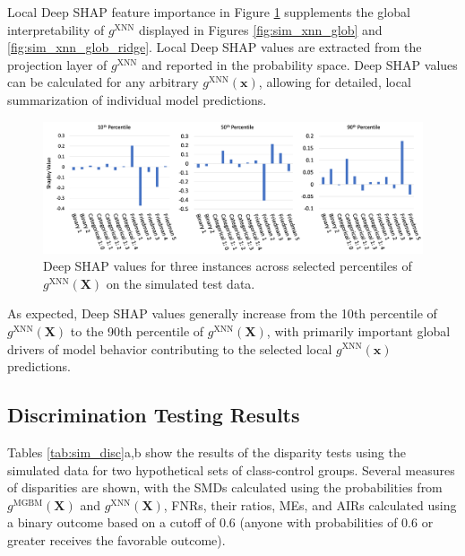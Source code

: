 \documentclass[information,article,accept,moreauthors,pdftex]{Definitions/mdpi}
\begin{document}
{Local Deep SHAP feature importance in Figure \ref{fig:sim_xnn_loc} supplements the global interpretability of $g^\text{XNN}$ displayed in Figures \ref{fig:sim_xnn_glob} and \ref{fig:sim_xnn_glob_ridge}. Local Deep SHAP values are extracted from the projection layer of $g^\text{XNN}$ and reported in the probability space. Deep SHAP values can be calculated for any arbitrary $g^\text{XNN}(\mathbf{x})$, allowing for detailed, local summarization of individual model predictions. 

\begin{figure}[H]
	\centering
	\includegraphics[width=15cm]{img/sim_xnn_loc.png}
	\caption{Deep SHAP values for three instances across selected percentiles of $g^\text{XNN}(\mathbf{X})$ on the simulated test data.}
	\label{fig:sim_xnn_loc}
\end{figure}  

 As expected, Deep SHAP values generally increase from the 10{th} percentile of $g^\text{XNN}(\mathbf{X})$ to the 90{th} percentile of $g^\text{XNN}(\mathbf{X})$, with primarily important global drivers of model behavior contributing to the selected local $g^\text{XNN}(\mathbf{x})$ predictions.

\subsection{Discrimination Testing Results}\label{a_ssec:dis_sim}

Tables \ref{tab:sim_disc}{a,b} show the results of the disparity tests using the simulated data for two hypothetical sets of class-control groups.  Several measures of disparities are shown, with the SMDs calculated using the probabilities from $g^{\text{MGBM}}(\mathbf{X})$ and  $g^{\text{XNN}}(\mathbf{X})$, FNRs, their ratios, MEs, and AIRs calculated using a binary outcome based on a cutoff of 0.6 (anyone with probabilities of 0.6 or greater receives the favorable outcome).

}
\end{document}

